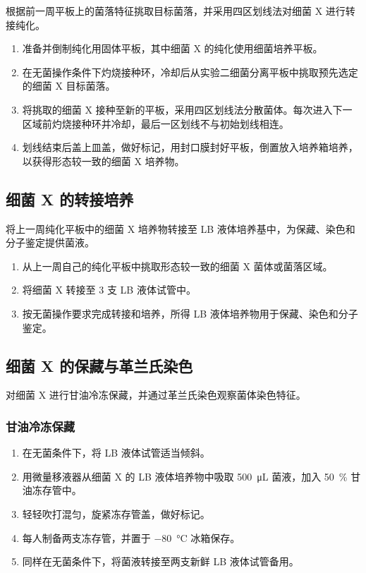 \documentclass[UTF8,a4paper,12pt,fontset=none]{ctexart}
\numberwithin{figure}{section}
\begin{document}
根据前一周平板上的菌落特征挑取目标菌落，并采用四区划线法对细菌 X 进行转接纯化。

\begin{enumerate}[label=\arabic*.]
    \item 准备并倒制纯化用固体平板，其中细菌 X 的纯化使用细菌培养平板。
    \item 在无菌操作条件下灼烧接种环，冷却后从实验二细菌分离平板中挑取预先选定的细菌 X 目标菌落。
    \item 将挑取的细菌 X 接种至新的平板，采用四区划线法分散菌体。每次进入下一区域前灼烧接种环并冷却，最后一区划线不与初始划线相连。
    \item 划线结束后盖上皿盖，做好标记，用封口膜封好平板，倒置放入培养箱培养，以获得形态较一致的细菌 X 培养物。
\end{enumerate}

\subsection{细菌 X 的转接培养}

将上一周纯化平板中的细菌 X 培养物转接至 LB 液体培养基中，为保藏、染色和分子鉴定提供菌液。

\begin{enumerate}[label=\arabic*.]
    \item 从上一周自己的纯化平板中挑取形态较一致的细菌 X 菌体或菌落区域。
    \item 将细菌 X 转接至 3 支 LB 液体试管中。
    \item 按无菌操作要求完成转接和培养，所得 LB 液体培养物用于保藏、染色和分子鉴定。
\end{enumerate}

\subsection{细菌 X 的保藏与革兰氏染色}

对细菌 X 进行甘油冷冻保藏，并通过革兰氏染色观察菌体染色特征。

\subsubsection{甘油冷冻保藏}

\begin{enumerate}[label=\arabic*.]
    \item 在无菌条件下，将 LB 液体试管适当倾斜。
    \item 用微量移液器从细菌 X 的 LB 液体培养物中吸取 \SI{500}{\micro\liter} 菌液，加入 \SI{50}{\percent} 甘油冻存管中。
    \item 轻轻吹打混匀，旋紧冻存管盖，做好标记。
    \item 每人制备两支冻存管，并置于 \SI{-80}{\celsius} 冰箱保存。
    \item 同样在无菌条件下，将菌液转接至两支新鲜 LB 液体试管备用。
\end{enumerate}
\end{document}
